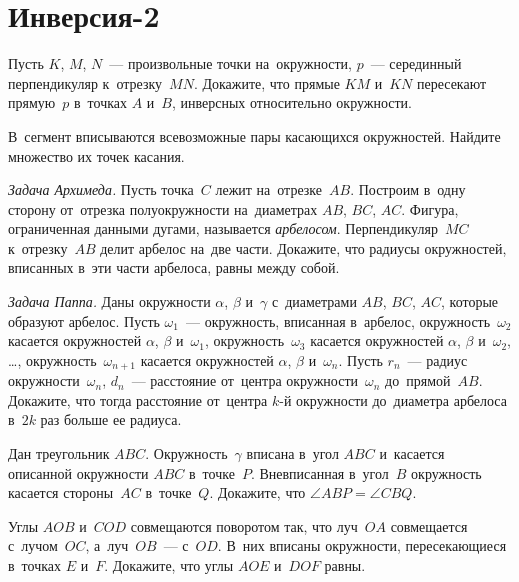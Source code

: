 
\section*{Инверсия-2}


\begin{problems}

\item
Пусть $K$, $M$, $N$~--- произвольные точки на~окружности, $p$~--- серединный
перпендикуляр к~отрезку~$MN$.
Докажите, что прямые $KM$ и~$KN$ пересекают прямую~$p$ в~точках $A$ и~$B$,
инверсных относительно окружности.

\item
В~сегмент вписываются всевозможные пары касающихся окружностей.
Найдите множество их точек касания.

\item \emph{Задача Архимеда.}
Пусть точка~$C$ лежит на~отрезке~$AB$.
Построим в~одну сторону от~отрезка полуокружности
на~диаметрах $AB$, $BC$, $AC$.
Фигура, ограниченная данными дугами, называется \emph{арбелосом}.
Перпендикуляр~$MC$ к~отрезку~$AB$ делит арбелос на~две части.
Докажите, что радиусы окружностей, вписанных в~эти части арбелоса, равны между
собой.

\item \emph{Задача Паппа.}
Даны окружности $\alpha$, $\beta$ и~$\gamma$ с~диаметрами $AB$, $BC$, $AC$,
которые образуют арбелос.
Пусть $\omega_1$~--- окружность, вписанная в~арбелос,
окружность~$\omega_2$ касается окружностей $\alpha$, $\beta$ и~$\omega_1$,
окружность~$\omega_3$ касается окружностей $\alpha$, $\beta$ и~$\omega_2$,
\ldots,
окружность~$\omega_{n+1}$ касается окружностей $\alpha$, $\beta$ и~$\omega_n$.
Пусть $r_n$~--- радиус окружности~$\omega_n$, $d_n$~--- расстояние от~центра
окружности~$\omega_n$ до~прямой~$AB$.
Докажите, что тогда расстояние от~центра $k$-й окружности до~диаметра арбелоса
в~$2k$ раз больше ее радиуса.

\item
Дан треугольник $ABC$.
Окружность~$\gamma$ вписана в~угол $ABC$ и~касается описанной окружности $ABC$
в~точке~$P$.
Вневписанная в~угол~$B$ окружность касается стороны~$AC$ в~точке~$Q$.
Докажите, что $\angle ABP = \angle CBQ$.

\item
Углы $AOB$ и~$COD$ совмещаются поворотом так, что луч~$OA$ совмещается
с~лучом~$OC$, а~луч~$OB$~--- с~$OD$.
В~них вписаны окружности, пересекающиеся в~точках $E$ и~$F$.
Докажите, что углы $AOE$ и~$DOF$ равны.

\end{problems}

